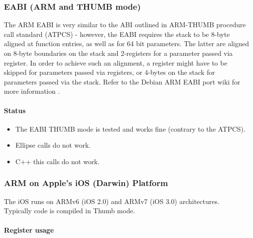 \newpage

\subsubsection{EABI (ARM and THUMB mode)}


The ARM EABI is very similar to the ABI outlined in ARM-THUMB procedure call
standard (ATPCS) \cite{ATPCS} - however, the EABI requires the stack to be
8-byte aligned at function entries, as well as for 64 bit parameters. The latter
are aligned on 8-byte boundaries on the stack and 2-registers for a parameter
passed via register. In order to achieve such an alignment, a register might
have to be skipped for parameters passed via registers, or 4-bytes on the stack
for parameters passed via the stack. Refer to the Debian ARM EABI port wiki
for more information \cite{armeabi}.


\paragraph{Status}

\begin{itemize}
\item The EABI THUMB mode is tested and works fine (contrary to the ATPCS).
\item Ellipse calls do not work.
\item C++ this calls do not work.
\end{itemize}

\newpage

\subsubsection{ARM on Apple's iOS (Darwin) Platform}


The iOS runs on ARMv6 (iOS 2.0) and ARMv7 (iOS 3.0) architectures.
Typically code is compiled in Thumb mode.

\paragraph{Register usage}

